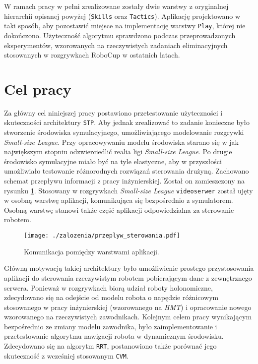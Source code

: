  W ramach pracy w pełni zrealizowane zostały dwie warstwy z oryginalnej hierarchii opisanej powyżej (\texttt{Skills} oraz \texttt{Tactics}). Aplikację projektowano w taki sposób, aby pozostawić miejsce
 na implementację warstwy \texttt{Play}, której nie dokończono.
Użyteczność algorytmu sprawdzono podczas przeprowadzonych eksperymentów, wzorowanych na rzeczywistych zadaniach eliminacyjnych stosowanych w rozgrywkach RoboCup w ostatnich latach.

\section{Cel pracy}
Za główny cel niniejszej pracy postawiono przetestowanie użyteczności i skuteczności architektury \texttt{STP}. Aby jednak zrealizować to zadanie konieczne było
stworzenie środowiska symulacyjnego, umożliwiającego modelowanie rozgrywki \emph{Small-size League}. Przy opracowywaniu modelu środowiska starano się w jak największym stopniu odzwierciedlić realia
ligi \emph{Small-size League}. Po drugie środowisko symulacyjne miało być na tyle elastyczne, aby w przyszłości umożliwiało testowanie różnorodnych rozwiązań sterowania drużyną.
Zachowano schemat przepływu informacji z pracy inżynierskiej. Został on zamieszczony na rysunku \ref{fig:przeplyw_sterowania}. Stosowany w rozgrywkach \emph{Small-size League} \texttt{videoserwer} został
ujęty w osobną warstwę  aplikacji, komunikująca się bezpośrednio z symulatorem. Osobną warstwę stanowi także część aplikacji odpowiedzialna za sterowanie robotem.
\begin{figure}[H]
\centering
\texttt{[image: ./zalozenia/przeplyw\_sterowania.pdf]}
\caption{Komunikacja pomiędzy warstwami aplikacji.} \label{fig:przeplyw_sterowania}
\end{figure}
Główną motywacją takiej architektury było umożliwienie prostego przystosowania aplikacji do sterowania rzeczywistym robotem pobierającym dane z zewnętrznego serwera. 
Ponieważ w rozgrywkach biorą udział roboty holonomiczne, zdecydowano się na odejście od modelu robota o napędzie różnicowym stosowanego w pracy inżynierskiej (wzorowanego na \textit{HMT}) i opracowanie nowego wzorowanego na rzeczywistych
zawodnikach.
Kolejnym celem pracy wynikającym bezpośrednio ze zmiany modelu zawodnika, było zaimplementowanie i przetestowanie algorytmu nawigacji robota w dynamicznym środowisku. Zdecydowano się na algorytm \texttt{RRT},
postanowiono także porównać jego skuteczność z wcześniej stosowanym \texttt{CVM}.

